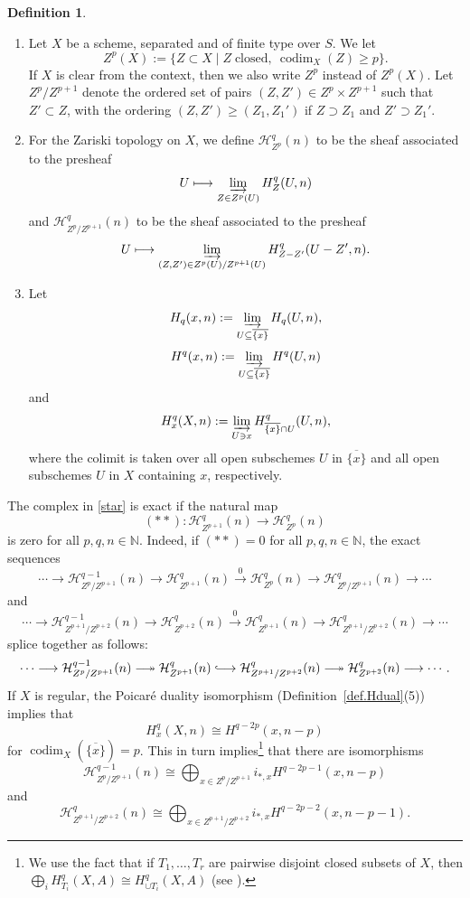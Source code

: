 \documentclass[11pt]{amsart}
\numberwithin{equation}{section}
\newtheorem{Key lemma}[theorem]{Key lemma}
\theoremstyle{definition}
\newtheorem{definition}[theorem]{Definition}
\theoremstyle{remark}
\newcommand{\To}{\longrightarrow}
\newcommand{\cal}{\mathcal}
\DeclareMathOperator{\codim}{codim}
\newcommand{\xTo}[1]{\stackrel{#1}{\To}}
\newcommand{\longtwoheadrightarrow}{\relbar\joinrel\twoheadrightarrow}
\newcommand{\longhookrightarrow}{\lhook\joinrel\longrightarrow}
\begin{document}
\begin{definition}\leavevmode
\begin{enumerate}
\item Let $X$ be a scheme, separated and of finite type over $S$. We let
  $$Z^p(X):=\{Z\subset X \mid Z\;\mathrm{ closed},\ \codim_X(Z)\geq p\}.$$
If $X$ is clear from the context, then we also write $Z^p$ instead of $Z^p(X)$. Let $Z^p/Z^{p+1}$ denote the ordered set of pairs $(Z, Z')\in Z^p\times Z^{p+1}$ such that $Z'\subset Z$, with the ordering $(Z,Z')\geq (Z_1,Z_1')$ if $Z\supset Z_1$ and $Z'\supset Z_1'$.
\item For the Zariski topology on $X$, we define $\cal H^q_{Z^p}(n)$ to be the sheaf associated to the presheaf
$$U\longmapsto \varinjlim_{Z\in Z^p(U)} H^q_{Z}(U,n)$$
and $\cal H^q_{Z^p/Z^{p+1}}(n)$ to be the sheaf associated to the presheaf
$$U\longmapsto \varinjlim_{(Z,Z')\in Z^p(U)/Z^{p+1}(U)} H^q_{Z-Z'}(U-Z',n).$$
\item Let
$$H_q(x,n):=\varinjlim_{U\subseteq \overline{\{x\}}} H_q(U,n),$$
$$H^q(x,n):=\varinjlim_{U\subseteq \overline{\{x\}}} H^q(U,n)$$
and
$$H^q_x(X,n):=\varinjlim_{U\ni x} H^q_{\overline{\{x\}}\cap U}(U,n),$$
where the colimit is taken over all open subschemes $U$ in $\overline{\{x\}}$ and all open subschemes $U$ in $X$ containing $x$, respectively.
\end{enumerate}
\end{definition}

The complex in \eqref{star} is exact if the natural map
$$(**)\colon\cal H^q_{Z^{p+1}}(n)\to \cal H^q_{Z^p}(n)$$ is zero for all $p,q,n\in \mathbb{N}$. Indeed, if $(**)=0$ for all $p,q,n\in \mathbb{N}$, the exact sequences 
$$\cdots\To \cal H^{q-1}_{Z^p/Z^{p+1}}(n)\To\cal H^q_{Z^{p+1}}(n)\xTo{0} \cal H^q_{Z^p}(n)\To \cal H^{q}_{Z^p/Z^{p+1}}(n)\To\cdots$$
and
$$\cdots\To \cal H^{q-1}_{Z^{p+1}/Z^{p+2}}(n)\To\cal H^q_{Z^{p+2}}(n)\xTo{0} \cal H^q_{Z^{p+1}}(n)\To \cal H^{q}_{Z^{p+1}/Z^{p+2}}(n)\To\cdots $$
splice together as follows:
$$\cdots\To \cal H^{q-1}_{Z^p/Z^{p+1}}(n)\longtwoheadrightarrow\cal H^q_{Z^{p+1}}(n)\longhookrightarrow \cal H^q_{Z^{p+1}/Z^{p+2}}(n) \longtwoheadrightarrow \cal H^q_{Z^{p+2}}(n)\To\cdots .$$
If $X$ is regular, the Poicar\'e duality isomorphism (Definition~\ref{def.Hdual}(5)) implies that
$$H^q_x(X,n)\cong H^{q-2p}(x,n-p)$$
for $\codim_X(\overline{\{x\}})=p$. This in turn implies\footnote{We use the fact that if $T_1,\ldots,T_r$ are pairwise disjoint closed subsets of $X$, then $\bigoplus_i H^q_{T_i}(X,A)\cong H^q_{\cup T_i}(X,A)$ (see \cite[Lemma  1.2.1]{CHK97}).}  that there are isomorphisms 
$$
\cal H^{q-1}_{Z^p/Z^{p+1}}(n)\cong \bigoplus_{x\in Z^p/Z^{p+1}}i_{*,x}H^{q-2p-1}(x,n-p)
$$
and
$$
\cal H^{q}_{Z^{p+1}/Z^{p+2}}(n)\cong \bigoplus_{x\in Z^{p+1}/Z^{p+2}}i_{*,x}H^{q-2p-2}(x,n-p-1).
$$
\end{document}

